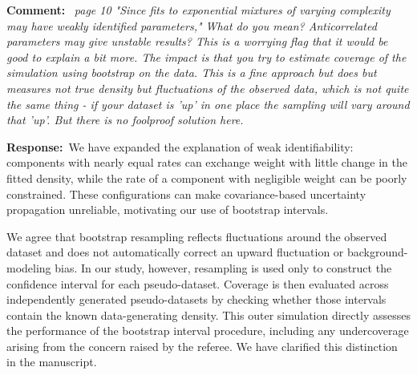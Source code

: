 \documentclass[11pt,a4paper]{article}
\newcommand{\refcomment}[1]{%
    \medskip\noindent\textbf{\color{refcolor}Comment:}\ %
    {\itshape #1}\par\smallskip
}
\newcommand{\response}{\noindent\textbf{Response:}\ }
\begin{document}
\refcomment{page 10 "Since fits to exponential mixtures of varying complexity may
have weakly identified parameters," What do you mean? Anticorrelated
parameters may give unstable results? This is a worrying flag that it would be
good to explain a bit more. The impact is that you try to estimate coverage
of the simulation using bootstrap on the data. This is a fine approach but
does but measures not true density but fluctuations of the observed data,
which is not quite the same thing - if your dataset is ’up’ in one place the
sampling will vary around that ’up’. But there is no foolproof solution here.}

\response We have expanded the explanation of weak identifiability: components with nearly equal rates can exchange weight with little change in the fitted density, while the rate of a component with negligible weight can be poorly constrained. These configurations can make covariance-based uncertainty propagation unreliable, motivating our use of bootstrap intervals.

We agree that bootstrap resampling reflects fluctuations around the observed dataset and does not automatically correct an upward fluctuation or background-modeling bias. In our study, however, resampling is used only to construct the confidence interval for each pseudo-dataset. Coverage is then evaluated across independently generated pseudo-datasets by checking whether those intervals contain the known data-generating density. This outer simulation directly assesses the performance of the bootstrap interval procedure, including any undercoverage arising from the concern raised by the referee. We have clarified this distinction in the manuscript.
\end{document}
